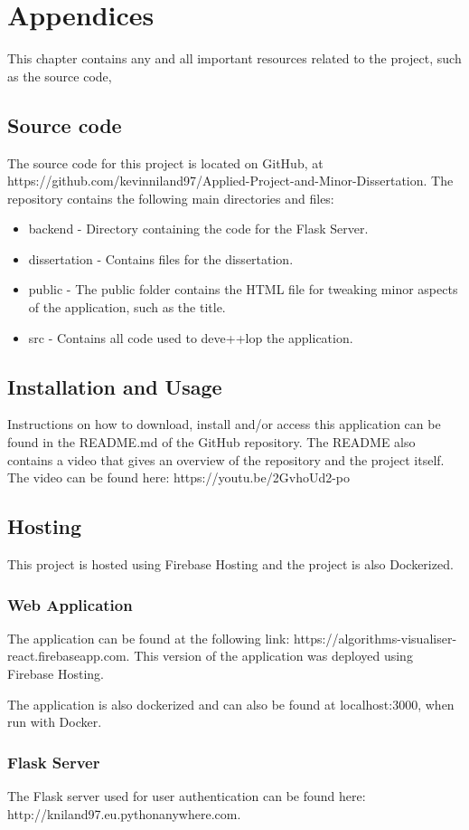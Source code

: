 \chapter{Appendices}
This chapter contains any and all important resources related to the project, such as the source code, 

\section{Source code}
The source code for this project is located on GitHub, at https://github.com/kevinniland97/Applied-Project-and-Minor-Dissertation. The repository contains the following main directories and files:

\begin{itemize}
    \item backend - Directory containing the code for the Flask Server.
    \item dissertation - Contains files for the dissertation.
    \item public - The public folder contains the HTML file for tweaking minor aspects of the application, such as the title.
    \item src - Contains all code used to deve++lop the application.
\end{itemize}

\section{Installation and Usage}
Instructions on how to download, install and/or access this application can be found in the README.md of the GitHub repository. The README also contains a video that gives an overview of the repository and the project itself. The video can be found here: https://youtu.be/2GvhoUd2-po

\newpage
\section{Hosting}
This project is hosted using Firebase Hosting and the project is also Dockerized.

\subsection{Web Application}
The application can be found at the following link: https://algorithms-visualiser-react.firebaseapp.com. This version of the application was deployed using Firebase Hosting.

\medskip
The application is also dockerized and can also be found at localhost:3000, when run with Docker.

\subsection{Flask Server}
The Flask server used for user authentication can be found here: http://kniland97.eu.pythonanywhere.com.